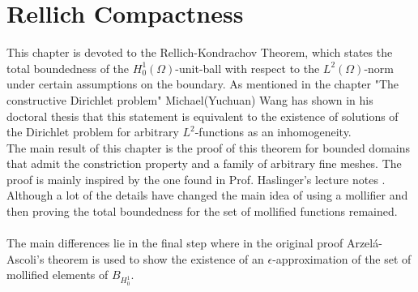 \documentclass[11pt,a4paper,leqno]{report}
\numberwithin{equation}{chapter}
\begin{document}
\chapter{Rellich Compactness}
This chapter is devoted to the Rellich-Kondrachov Theorem, which states the total boundedness of the $H^1_0(\Omega)$-unit-ball with respect to the $L^2(\Omega)$-norm under certain assumptions on the boundary. As mentioned in the chapter "The constructive Dirichlet problem" Michael(Yuchuan) Wang has shown in his doctoral thesis \cite{Wang} that this statement is equivalent to the existence of solutions of the Dirichlet problem for arbitrary $L^2$-functions as an inhomogeneity.\\
The main result of this chapter is the proof of this theorem for bounded domains that admit the constriction property and a family of arbitrary fine meshes. The proof is mainly inspired by the one found in Prof. Haslinger's lecture notes \cite{Haslinger}. Although a lot of the details have changed the main idea of using a mollifier and then proving the total boundedness for the set of mollified functions remained.\\
\\
The main differences lie in the final step where in the original proof Arzel\'{a}-Ascoli's theorem is used to show the existence of an $\epsilon$-approximation of the set of mollified elements of $B_{H^1_0}$. 
\end{document}
